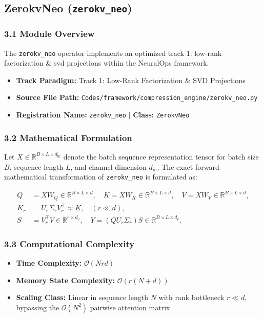 \subsection{ZerokvNeo (\texttt{zerokv\_neo})}
\label{sec:app_module_zerokv\_neo}

\subsubsection*{3.1 Module Overview}
The \texttt{zerokv\_neo} operator implements an optimized track 1: low-rank factorization \& svd projections within the NeuralOps framework.
\begin{itemize}
    \item \textbf{Track Paradigm:} Track 1: Low-Rank Factorization & SVD Projections
    \item \textbf{Source File Path:} \texttt{Codes/framework/compression\_engine/zerokv\_neo.py}
    \item \textbf{Registration Name:} \texttt{zerokv\_neo} $\mid$ \textbf{Class:} \texttt{ZerokvNeo}
\end{itemize}

\subsubsection*{3.2 Mathematical Formulation}
Let $X \in \mathbb{R}^{B \times L \times d_{\text{in}}}$ denote the batch sequence representation tensor for batch size $B$, sequence length $L$, and channel dimension $d_{\text{in}}$. The exact forward mathematical transformation of \texttt{zerokv\_neo} is formulated as:

\begin{align}
Q &= X W_Q \in \mathbb{R}^{B \times L \times d}, \quad K = X W_K \in \mathbb{R}^{B \times L \times d}, \quad V = X W_V \in \mathbb{R}^{B \times L \times d}, \\
K_r &= U_r \Sigma_r V_r^\top \approx K, \quad (r \ll d), \\
S &= V_r^\top V \in \mathbb{R}^{r \times d_v}, \quad Y = (Q U_r \Sigma_r) S \in \mathbb{R}^{B \times L \times d_v}.
\end{align}


\subsubsection*{3.3 Computational Complexity}
\begin{itemize}
    \item \textbf{Time Complexity:} $\mathcal{O}(N r d)$
    \item \textbf{Memory State Complexity:} $\mathcal{O}(r(N + d))$
    \item \textbf{Scaling Class:} Linear in sequence length $N$ with rank bottleneck $r \ll d$, bypassing the $\mathcal{O}(N^2)$ pairwise attention matrix.
\end{itemize}


